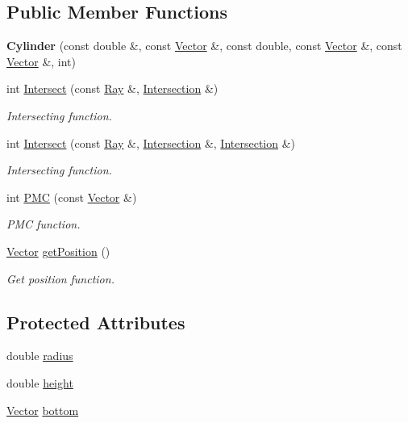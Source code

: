 \subsection*{\-Public \-Member \-Functions}
\begin{DoxyCompactItemize}
\item 
\hypertarget{class_cylinder_aac916600a494275d514aa7ca14d1e61a}{
{\bfseries \-Cylinder} (const double \&, const \hyperlink{class_vector}{\-Vector} \&, const double, const \hyperlink{class_vector}{\-Vector} \&, const \hyperlink{class_vector}{\-Vector} \&, int)}
\label{class_cylinder_aac916600a494275d514aa7ca14d1e61a}

\item 
int \hyperlink{class_cylinder_ac0fefa4e21c59f64bd1b52d46ffc660f}{\-Intersect} (const \hyperlink{class_ray}{\-Ray} \&, \hyperlink{class_intersection}{\-Intersection} \&)
\begin{DoxyCompactList}\small\item\em \-Intersecting function. \end{DoxyCompactList}\item 
int \hyperlink{class_cylinder_ad5f756db8354800d0a95862f6de2a5fe}{\-Intersect} (const \hyperlink{class_ray}{\-Ray} \&, \hyperlink{class_intersection}{\-Intersection} \&, \hyperlink{class_intersection}{\-Intersection} \&)
\begin{DoxyCompactList}\small\item\em \-Intersecting function. \end{DoxyCompactList}\item 
int \hyperlink{class_cylinder_a54d8f47f574488e583868fbd5dfd9abf}{\-P\-M\-C} (const \hyperlink{class_vector}{\-Vector} \&)
\begin{DoxyCompactList}\small\item\em \-P\-M\-C function. \end{DoxyCompactList}\item 
\hyperlink{class_vector}{\-Vector} \hyperlink{class_cylinder_aaec0c6f325302a116df1d210791b575c}{get\-Position} ()
\begin{DoxyCompactList}\small\item\em \-Get position function. \end{DoxyCompactList}\end{DoxyCompactItemize}
\subsection*{\-Protected \-Attributes}
\begin{DoxyCompactItemize}
\item 
double \hyperlink{class_cylinder_a8a825799285bcf60b49b8aef0459b498}{radius}
\item 
double \hyperlink{class_cylinder_a211cebc37f1025850cdacffe1badb578}{height}
\item 
\hyperlink{class_vector}{\-Vector} \hyperlink{class_cylinder_ad6d4d4070807f4680a250ec1227fc482}{bottom}
\end{DoxyCompactItemize}


